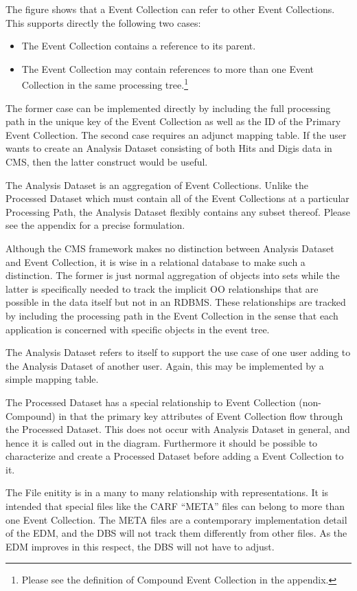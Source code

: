 \documentclass{cmspaper}
\begin{document}
The figure shows that a Event Collection can refer to other Event Collections.  
This supports directly the following two cases: 
\begin{itemize}
\item The Event Collection contains a reference to its parent. 
\item The Event Collection may contain references to more than one 
Event Collection in the same processing tree.\footnote{Please see the definition of
Compound Event Collection in the appendix.}
\end{itemize}
The former case can be implemented directly by including the 
full processing path in the unique key of the Event Collection as well as the 
ID of the Primary Event Collection.  The second case requires an adjunct 
mapping table. 
If the user wants to create an Analysis Dataset consisting of both Hits and 
Digis data in CMS, then the latter construct would be useful.  

The Analysis Dataset is an aggregation of Event Collections.  Unlike the 
Processed Dataset which must contain all of the Event Collections at a 
particular Processing Path, the Analysis Dataset flexibly contains any subset
thereof.  Please see the appendix for a precise formulation.

Although the CMS framework makes no distinction between Analysis Dataset and Event Collection, 
it is wise in a relational database to make such a distinction.  The former is just normal aggregation
of objects into sets while the latter is specifically needed to track the implicit
OO relationships that are possible in the data itself
but not in an RDBMS. These relationships are tracked by including the processing path in the 
Event Collection in the sense that each application is concerned with specific objects in the 
event tree.  

The Analysis Dataset refers to itself to support
the use case of one user adding to the Analysis Dataset of another user.  Again, this
may be implemented by a simple mapping table.

The Processed Dataset has a special relationship to Event Collection (non-Compound) 
in that the primary key attributes 
of Event Collection flow through the Processed Dataset.  This does not occur 
with Analysis Dataset in general, and hence it is called out in the diagram.
Furthermore it should be possible to characterize and
create a Processed Dataset before adding a Event Collection to it.  

The File enitity is in a many to 
many relationship with representations.  It is intended that special files 
like the CARF ``META'' files can belong to more than one Event Collection.
The META files are a contemporary implementation detail of the EDM, 
and the DBS will not track them differently from other files.  
As the EDM improves in this 
respect, the DBS will not have to adjust.
\end{document}

